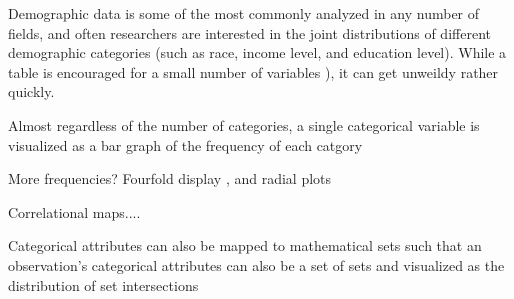 \documentclass[../main.text]{subfiles}
\begin{document}

Demographic data is some of the most commonly analyzed in any number of fields,
and often researchers are interested in the joint distributions of different
demographic categories (such as race, income level, and education level). While
a table is encouraged for a small number of variables
\cite{munznertablesgood}), it can get unweildy rather quickly.

Almost regardless of the number of categories, a single categorical variable
is visualized as a bar graph of the frequency of each catgory \cite{friendly:...}

More frequencies? Fourfold display \cite{Fienberg, 1975, Friendly, 1994a,c},
and radial plots \cite{...,....}

Correlational maps....


\cite{friendly:visualizingcategoricaldata}

Categorical attributes can also be mapped to mathematical sets such that an
observation's categorical attributes can also be a set of sets and visualized
as the distribution of set intersections \cite{UpSet, parrallel sets paper}
\end{document}
